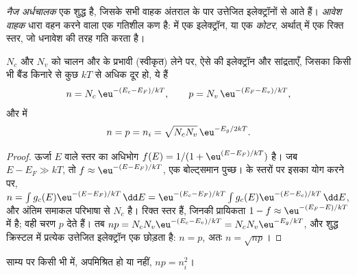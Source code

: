 \begin{definition}[वाहक]\label{def:b3:solid-state:carriers}
\emph{नैज अर्धचालक} एक शुद्ध
 है, जिसके सभी वाहक अंतराल के पार उत्तेजित इलेक्ट्रॉनों से आते हैं।
\emph{आवेश वाहक} धारा वहन करने वाला एक गतिशील
कण है:  में एक इलेक्ट्रॉन, या एक \emph{कोटर}, अर्थात्
 में एक रिक्त स्तर, जो धनावेश की तरह गति करता है।
\end{definition}

\begin{theorem}[नैज वाहक सांद्रता]\label{thm:b3:solid-state:intrinsic}
$N_c$ और $N_v$ को चालन और  के प्रभावी  (स्वीकृत)
लेने पर, ऐसे  की इलेक्ट्रॉन और  सांद्रताएँ,
जिसका  किसी भी बैंड किनारे से कुछ $kT$ से अधिक दूर हो, ये हैं
\[
  n = N_c\,\eu^{-(E_c - E_F)/kT}, \qquad p = N_v\,\eu^{-(E_F - E_v)/kT},
\]
और  में
\[
  n = p = n_i = \sqrt{N_cN_v}\,\eu^{-E_g/2kT}.
\]
\end{theorem}

\begin{proof}
ऊर्जा $E$ वाले स्तर का अधिभोग $f(E) = 1/(1 + \eu^{(E - E_F)/kT})$ है। जब
$E - E_F \gg kT$, तो $f \approx \eu^{-(E - E_F)/kT}$, एक बोल्ट्समान पुच्छ।  के स्तरों पर इसका योग करने पर, $n = \int g_c(E)\eu^{-(E - E_F)/kT}\,\dd E = \eu^{-(E_c - E_F)/kT}\int g_c(E)\eu^{-(E - E_c)/kT}\,\dd E$, और अंतिम समाकल
परिभाषा से $N_c$ है।  रिक्त स्तर हैं, जिनकी प्रायिकता $1 - f \approx \eu^{-(E_F - E)/kT}$
 में है; वही चरण $p$ देते हैं। तब $np = N_cN_v\eu^{-(E_c - E_v)/kT} = N_cN_v\eu^{-E_g/kT}$, और शुद्ध क्रिस्टल में
प्रत्येक उत्तेजित इलेक्ट्रॉन एक  छोड़ता है: $n = p$, अतः $n = \sqrt{np}$।
\end{proof}

\begin{proposition}[द्रव्य-अनुपाती क्रिया नियम]\label{prop:b3:solid-state:mass-action}
साम्य पर किसी भी  में, अपमिश्रित हो या नहीं, $np = n_i^2$।
\end{proposition}

